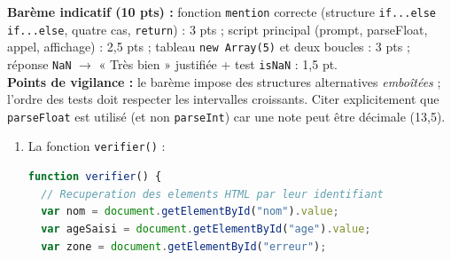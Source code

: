 \documentclass[11pt]{article}
\begin{document}
\begin{corrige}
\textbf{Barème indicatif (10 pts) :} fonction \texttt{mention} correcte (structure \texttt{if...else if...else}, quatre cas, \texttt{return}) : 3 pts ; script principal (prompt, parseFloat, appel, affichage) : 2,5 pts ; tableau \texttt{new Array(5)} et deux boucles : 3 pts ; réponse \texttt{NaN} $\to$ « Très bien » justifiée + test \texttt{isNaN} : 1,5 pt.\\
\textbf{Points de vigilance :} le barème impose des structures alternatives \emph{emboîtées} ; l'ordre des tests doit respecter les intervalles croissants. Citer explicitement que \texttt{parseFloat} est utilisé (et non \texttt{parseInt}) car une note peut être décimale (13,5).
\end{corrige}

\begin{corrige}
\begin{enumerate}
\item La fonction \texttt{verifier()} :
\begin{lstlisting}[language=JavaScript]
function verifier() {
  // Recuperation des elements HTML par leur identifiant
  var nom = document.getElementById("nom").value;
  var ageSaisi = document.getElementById("age").value;
  var zone = document.getElementById("erreur");


\end{lstlisting}
\end{enumerate}
\end{corrige}
\end{document}
